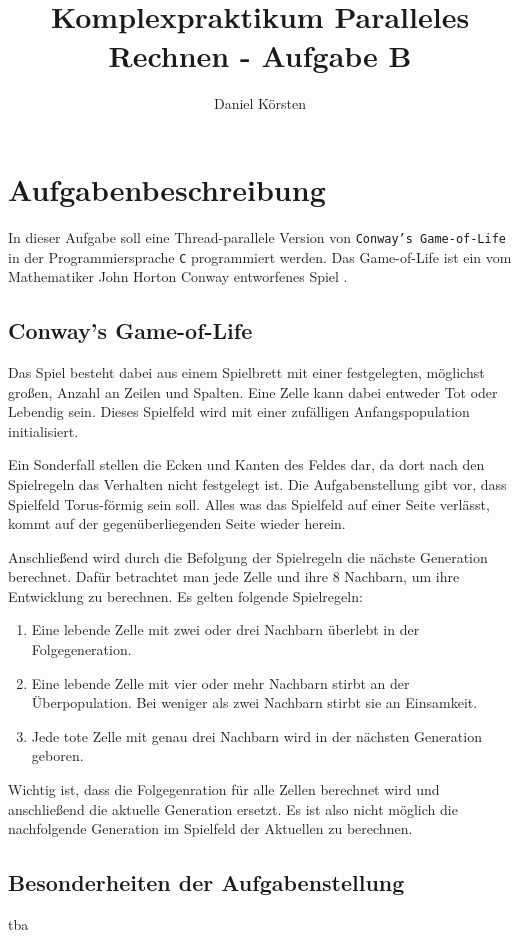 \documentclass[german,plainarticle,hyperref,utf8]{zihpub}
\author{Daniel Körsten}
\title{Komplexpraktikum Paralleles Rechnen - Aufgabe B}
\begin{document}
	\section{Aufgabenbeschreibung}
	In dieser Aufgabe soll eine Thread-parallele Version von \texttt{Conway’s Game-of-Life} in der Programmiersprache \texttt{C} programmiert werden. Das Game-of-Life ist ein vom Mathematiker John Horton Conway entworfenes Spiel \cite{gardner}.
	
	\subsection{Conway’s Game-of-Life}
	Das Spiel besteht dabei aus einem Spielbrett mit einer festgelegten, möglichst großen, Anzahl an Zeilen und Spalten. Eine Zelle kann dabei entweder Tot oder Lebendig sein. Dieses Spielfeld wird mit einer zufälligen Anfangspopulation initialisiert.
	
	Ein Sonderfall stellen die Ecken und Kanten des Feldes dar, da dort nach den Spielregeln das Verhalten nicht festgelegt ist. Die Aufgabenstellung gibt vor, dass Spielfeld Torus-förmig sein soll. Alles was das Spielfeld auf einer Seite verlässt, kommt auf der gegenüberliegenden Seite wieder herein.
	
	Anschließend wird durch die Befolgung der Spielregeln die nächste Generation berechnet. Dafür betrachtet man jede Zelle und ihre 8 Nachbarn, um ihre Entwicklung zu berechnen. Es gelten folgende Spielregeln:
	\begin{enumerate}
		\item Eine lebende Zelle mit zwei oder drei Nachbarn überlebt in der Folgegeneration.
		\item Eine lebende Zelle mit vier oder mehr Nachbarn stirbt an der Überpopulation. Bei weniger als zwei Nachbarn stirbt sie an Einsamkeit.
		\item Jede tote Zelle mit genau drei Nachbarn wird in der nächsten Generation geboren.
	\end{enumerate}
	Wichtig ist, dass die Folgegenration für alle Zellen berechnet wird und anschließend die aktuelle Generation ersetzt. Es ist also nicht möglich die nachfolgende Generation im Spielfeld der Aktuellen zu berechnen.
	
	\subsection{Besonderheiten der Aufgabenstellung}
	tba
	
	
	
\end{document}
